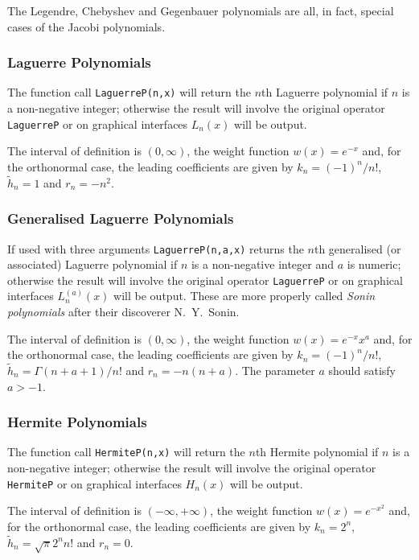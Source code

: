 The Legendre, Chebyshev and Gegenbauer polynomials are all, in fact, special
cases of the Jacobi polynomials.

\subsubsection{Laguerre Polynomials}
\hypertarget{LAGUERREP}{}
The function call \texttt{LaguerreP(n,x)} will return the $n$th Laguerre
polynomial if $n$ is a non-negative integer; otherwise the result will involve
the original operator \texttt{LaguerreP} or on graphical interfaces $L_n(x)$
will be output.

The interval of definition is $(0, \infty)$, the weight function
$w(x)=e^{-x}$ and, for the orthonormal case, the leading coefficients
are given by $k_n=(-1)^n/n!$, $\tilde{h}_n =1$ and $r_n = -n^2$.

\subsubsection{Generalised Laguerre Polynomials}
If used with three arguments \texttt{LaguerreP(n,a,x)} returns the $n$th
generalised (or associated) Laguerre polynomial if $n$ is a non-negative
integer and $a$ is numeric; otherwise the result will involve the original
operator \texttt{LaguerreP} or on graphical interfaces $L_n^{(a)}(x)$ will be
output. These are more properly called \emph{Sonin polynomials} after their
discoverer N.~Y.~Sonin.

The interval of definition is $(0, \infty)$, the weight function
$w(x)=e^{-x}x^a$ and, for the orthonormal case, the leading coefficients
are given by $k_n=(-1)^n/n!$, $\tilde{h}_n = \Gamma(n+a+1)/n!$ and
$r_n=-n(n+a)$. The parameter $a$ should satisfy $a > -1$.

\subsubsection{Hermite Polynomials}
\hypertarget{HERMITEP}{}
The function call \texttt{HermiteP(n,x)} will return the $n$th Hermite
polynomial if $n$ is a non-negative integer; otherwise the result will involve
the original operator \texttt{HermiteP} or on graphical interfaces $H_n(x)$
will be output.

The interval of definition is $(-\infty, +\infty)$, the weight function
$w(x)=e^{-x^2}$ and,
for the orthonormal case, the leading coefficients are given by
$k_n=2^n$, $\tilde{h}_n = \sqrt{\pi}2^nn!$ and $r_n=0$.

